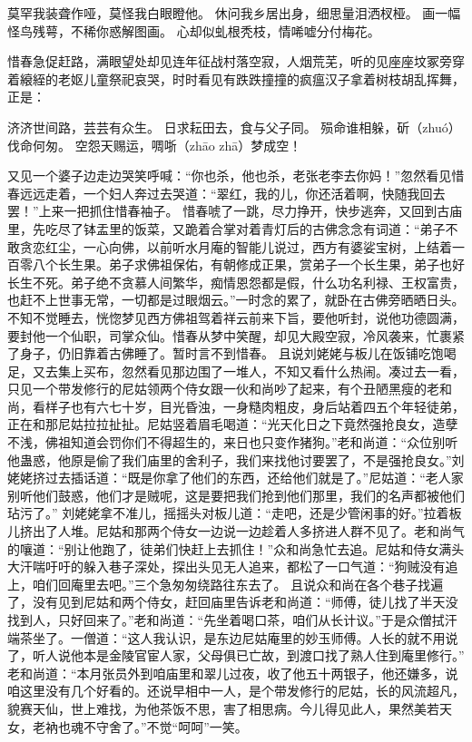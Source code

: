\documentclass[12pt,oneside]{book}
\begin{document}
莫罕我装聋作哑，莫怪我白眼瞪他。
休问我乡居出身，细思量泪洒杈桠。
画一幅怪鸟残萼，不稀你惑解图画。
心却似虬根秃枝，情唏嘘分付梅花。

惜春急促赶路，满眼望处却见连年征战村落空寂，人烟荒芜，听的见座座坟冢旁穿着縗絰的老妪儿童祭祀哀哭，时时看见有跌跌撞撞的疯瘟汉子拿着树枝胡乱挥舞，正是：

济济世间路，芸芸有众生。
日求耘田去，食与父子同。
殒命谁相躲，斫（zhuó）伐命何匆。
空怨天赐运，啁哳（zhāo zhā）梦成空！

又见一个婆子边走边哭笑呼喊：“你也杀，他也杀，老张老李去你妈！”忽然看见惜春远远走着，一个妇人奔过去哭道：“翠红，我的儿，你还活着啊，快随我回去罢！”上来一把抓住惜春袖子。
惜春唬了一跳，尽力挣开，快步逃奔，又回到古庙里，先吃尽了钵盂里的饭菜，又跪着合掌对着青灯后的古佛念念有词道：“弟子不敢贪恋红尘，一心向佛，以前听水月庵的智能儿说过，西方有婆娑宝树，上结着一百零八个长生果。弟子求佛祖保佑，有朝修成正果，赏弟子一个长生果，弟子也好长生不死。弟子绝不贪慕人间繁华，痴情恩怨都是假，什么功名利禄、王权富贵，也赶不上世事无常，一切都是过眼烟云。”一时念的累了，就卧在古佛旁晒晒日头。不知不觉睡去，恍惚梦见西方佛祖驾着祥云前来下旨，要他听封，说他功德圆满，要封他一个仙职，司掌众仙。惜春从梦中笑醒，却见大殿空寂，冷风袭来，忙裹紧了身子，仍旧靠着古佛睡了。暂时言不到惜春。
且说刘姥姥与板儿在饭铺吃饱喝足，又去集上买布，忽然看见那边围了一堆人，不知又看什么热闹。凑过去一看，只见一个带发修行的尼姑领两个侍女跟一伙和尚吵了起来，有个丑陋黑瘦的老和尚，看样子也有六七十岁，目光昏浊，一身糙肉粗皮，身后站着四五个年轻徒弟，正在和那尼姑拉拉扯扯。尼姑竖着眉毛喝道：“光天化日之下竟然强抢良女，造孽不浅，佛祖知道会罚你们不得超生的，来日也只变作猪狗。”老和尚道：“众位别听他蛊惑，他原是偷了我们庙里的舍利子，我们来找他讨要罢了，不是强抢良女。”刘姥姥挤过去插话道：“既是你拿了他们的东西，还给他们就是了。”尼姑道：“老人家别听他们鼓惑，他们才是贼呢，这是要把我们抢到他们那里，我们的名声都被他们玷污了。”
刘姥姥拿不准儿，摇摇头对板儿道：“走吧，还是少管闲事的好。”拉着板儿挤出了人堆。尼姑和那两个侍女一边说一边趁着人多挤进人群不见了。老和尚气的嚷道：“别让他跑了，徒弟们快赶上去抓住！”众和尚急忙去追。尼姑和侍女满头大汗喘吁吁的躲入巷子深处，探出头见无人追来，都松了一口气道：“狗贼没有追上，咱们回庵里去吧。”三个急匆匆绕路往东去了。
且说众和尚在各个巷子找遍了，没有见到尼姑和两个侍女，赶回庙里告诉老和尚道：“师傅，徒儿找了半天没找到人，只好回来了。”老和尚道：“先坐着喝口茶，咱们从长计议。”于是众僧拭汗端茶坐了。一僧道：“这人我认识，是东边尼姑庵里的妙玉师傅。人长的就不用说了，听人说他本是金陵官宦人家，父母俱已亡故，到渡口找了熟人住到庵里修行。”
老和尚道：“本月张员外到咱庙里和翠儿过夜，收了他五十两银子，他还嫌多，说咱这里没有几个好看的。还说早相中一人，是个带发修行的尼姑，长的风流超凡，貌赛天仙，世上难找，为他茶饭不思，害了相思病。今儿得见此人，果然美若天女，老衲也魂不守舍了。”不觉“呵呵”一笑。
\end{document}
